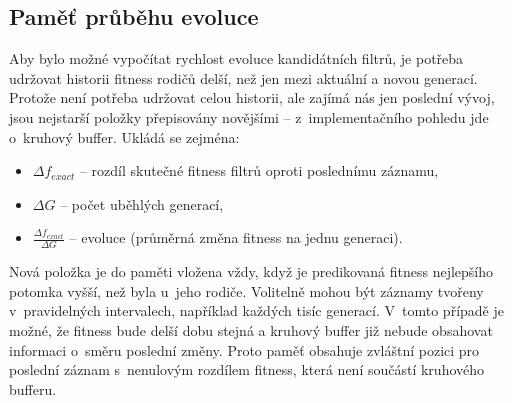 
\subsection{Paměť průběhu evoluce}
\label{secDesignHistory}

Aby bylo možné vypočítat rychlost evoluce kandidátních filtrů, je potřeba udržovat historii fitness rodičů delší, než jen mezi aktuální a novou generací. Protože není potřeba udržovat celou historii, ale zajímá nás jen poslední vývoj, jsou nejstarší položky přepisovány novějšími -- z~implementačního pohledu jde o~kruhový buffer. Ukládá se zejména:

\begin{itemize}
    \item $\Delta{}f_{\mathit{exact}}$ -- rozdíl skutečné fitness filtrů oproti poslednímu záznamu,
    \item $\Delta{}G$ -- počet uběhlých generací,
    \item $\frac{\Delta{}f_{\mathit{exact}}}{\Delta{}G}$ --  evoluce (průměrná změna fitness na jednu generaci).
\end{itemize}

Nová položka je do paměti vložena vždy, když je predikovaná fitness nejlepšího potomka vyšší, než byla u~jeho rodiče. Volitelně mohou být záznamy tvořeny v~pravidelných intervalech, například každých tisíc generací. V~tomto případě je možné, že fitness bude delší dobu stejná a kruhový buffer již nebude obsahovat informaci o~směru poslední změny. Proto paměť obsahuje zvláštní pozici pro poslední záznam s~nenulovým rozdílem fitness, která není součástí kruhového bufferu.






